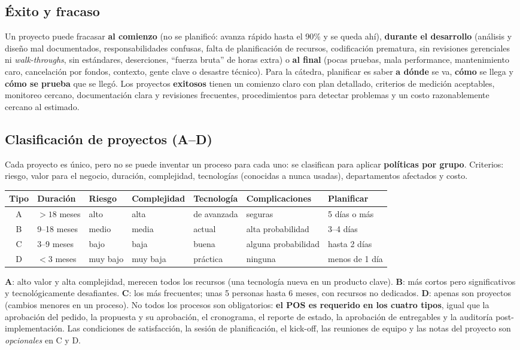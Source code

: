 \documentclass[11pt,a4paper]{article}
\begin{document}
\subsection{Éxito y fracaso}
Un proyecto puede fracasar \textbf{al comienzo} (no se planificó: avanza rápido hasta el 90\% y se queda ahí),
\textbf{durante el desarrollo} (análisis y diseño mal documentados, responsabilidades confusas, falta de
planificación de recursos, codificación prematura, sin revisiones gerenciales ni \emph{walk-throughs}, sin
estándares, deserciones, ``fuerza bruta'' de horas extra) o \textbf{al final} (pocas pruebas, mala
performance, mantenimiento caro, cancelación por fondos, contexto, gente clave o desastre técnico). Para la
cátedra, planificar es saber \textbf{a dónde} se va, \textbf{cómo} se llega y \textbf{cómo se prueba} que se
llegó. Los proyectos \textbf{exitosos} tienen un comienzo claro con plan detallado, criterios de medición
aceptables, monitoreo cercano, documentación clara y revisiones frecuentes, procedimientos para detectar
problemas y un costo razonablemente cercano al estimado.

\subsection{Clasificación de proyectos (A--D)}
Cada proyecto es único, pero no se puede inventar un proceso para cada uno: se clasifican para aplicar
\textbf{políticas por grupo}. Criterios: riesgo, valor para el negocio, duración, complejidad, tecnologías
(conocidas a nunca usadas), departamentos afectados y costo.
\begin{center}\small
\begin{tabular}{@{}c l l l l l l@{}}
\toprule
\textbf{Tipo} & \textbf{Duración} & \textbf{Riesgo} & \textbf{Complejidad} & \textbf{Tecnología} & \textbf{Complicaciones} & \textbf{Planificar}\\
\midrule
A & $>18$ meses & alto & alta & de avanzada & seguras & 5 días o más\\
B & 9--18 meses & medio & media & actual & alta probabilidad & 3--4 días\\
C & 3--9 meses & bajo & baja & buena & alguna probabilidad & hasta 2 días\\
D & $<3$ meses & muy bajo & muy baja & práctica & ninguna & menos de 1 día\\
\bottomrule
\end{tabular}
\end{center}
\textbf{A}: alto valor y alta complejidad, merecen todos los recursos (una tecnología nueva en un producto
clave). \textbf{B}: más cortos pero significativos y tecnológicamente desafiantes. \textbf{C}: los más
frecuentes; unas 5 personas hasta 6 meses, con recursos no dedicados. \textbf{D}: apenas son proyectos (cambios
menores en un proceso). No todos los procesos son obligatorios: \textbf{el POS es requerido en los cuatro
tipos}, igual que la aprobación del pedido, la propuesta y su aprobación, el cronograma, el reporte de estado,
la aprobación de entregables y la auditoría post-implementación. Las condiciones de satisfacción, la sesión de
planificación, el kick-off, las reuniones de equipo y las notas del proyecto son \emph{opcionales} en C y D.
\end{document}
